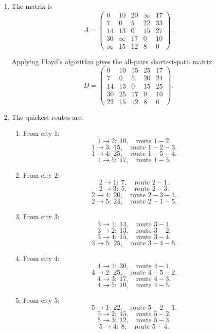 \documentclass[11pt]{article}
\begin{document}
\begin{enumerate}
    \item The matrix is
\[
A=
\begin{pmatrix}
0 & 10 & 20 & \infty & 17\\
7 & 0 & 5 & 22 & 33\\
14 & 13 & 0 & 15 & 27\\
30 & \infty & 17 & 0 & 10\\
\infty & 15 & 12 & 8 & 0
\end{pmatrix}.
\]

Applying Floyd's algorithm gives the all-pairs shortest-path matrix
\[
D=
\begin{pmatrix}
0 & 10 & 15 & 25 & 17\\
7 & 0 & 5 & 20 & 24\\
14 & 13 & 0 & 15 & 25\\
30 & 25 & 17 & 0 & 10\\
22 & 15 & 12 & 8 & 0
\end{pmatrix}.
\]

\item The quickest routes are:

\begin{enumerate}
\item From city $1$:
\[
1\to 2:\ 10,\quad \text{route }1-2.
\]
\[
1\to 3:\ 15,\quad \text{route }1-2-3.
\]
\[
1\to 4:\ 25,\quad \text{route }1-5-4.
\]
\[
1\to 5:\ 17,\quad \text{route }1-5.
\]

\item From city $2$:
\[
2\to 1:\ 7,\quad \text{route }2-1.
\]
\[
2\to 3:\ 5,\quad \text{route }2-3.
\]
\[
2\to 4:\ 20,\quad \text{route }2-3-4.
\]
\[
2\to 5:\ 24,\quad \text{route }2-1-5.
\]

\item From city $3$:
\[
3\to 1:\ 14,\quad \text{route }3-1.
\]
\[
3\to 2:\ 13,\quad \text{route }3-2.
\]
\[
3\to 4:\ 15,\quad \text{route }3-4.
\]
\[
3\to 5:\ 25,\quad \text{route }3-4-5.
\]

\item From city $4$:
\[
4\to 1:\ 30,\quad \text{route }4-1.
\]
\[
4\to 2:\ 25,\quad \text{route }4-5-2.
\]
\[
4\to 3:\ 17,\quad \text{route }4-3.
\]
\[
4\to 5:\ 10,\quad \text{route }4-5.
\]

\item From city $5$:
\[
5\to 1:\ 22,\quad \text{route }5-2-1.
\]
\[
5\to 2:\ 15,\quad \text{route }5-2.
\]
\[
5\to 3:\ 12,\quad \text{route }5-3.
\]
\[
5\to 4:\ 8,\quad \text{route }5-4.
\]
\end{enumerate}
\end{enumerate}
\end{document}
